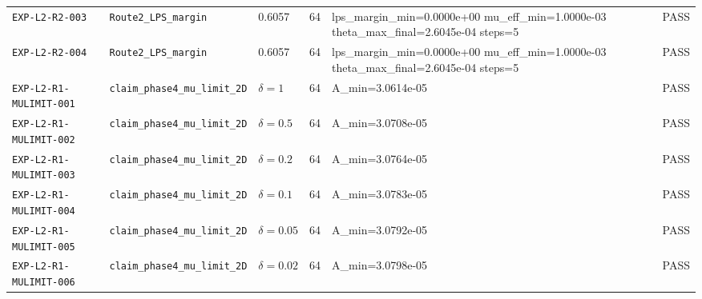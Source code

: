 {\begin{longtable}{@{}>{\raggedright\arraybackslash}p{} >{\raggedright\arraybackslash}p{} l l >{\raggedright\arraybackslash}p{} l@{}}
\texttt{EXP-\allowbreak{}L2-\allowbreak{}R2-\allowbreak{}003} & \texttt{Route2\_\allowbreak{}LPS\_\allowbreak{}margin} & 0.6057 & 64 & lps\_\allowbreak{}margin\_\allowbreak{}min=\allowbreak{}0.0000e+00  mu\_\allowbreak{}eff\_\allowbreak{}min=\allowbreak{}1.0000e-03  theta\_\allowbreak{}max\_\allowbreak{}final=\allowbreak{}2.6045e-04  steps=\allowbreak{}5 & \textsf{PASS}\\
\texttt{EXP-\allowbreak{}L2-\allowbreak{}R2-\allowbreak{}004} & \texttt{Route2\_\allowbreak{}LPS\_\allowbreak{}margin} & 0.6057 & 64 & lps\_\allowbreak{}margin\_\allowbreak{}min=\allowbreak{}0.0000e+00  mu\_\allowbreak{}eff\_\allowbreak{}min=\allowbreak{}1.0000e-03  theta\_\allowbreak{}max\_\allowbreak{}final=\allowbreak{}2.6045e-04  steps=\allowbreak{}5 & \textsf{PASS}\\
\texttt{EXP-\allowbreak{}L2-\allowbreak{}R1-\allowbreak{}MULIMIT-\allowbreak{}001} & \texttt{claim\_\allowbreak{}phase4\_\allowbreak{}mu\_\allowbreak{}limit\_\allowbreak{}2D} & $\delta=\allowbreak{}1$ & 64 & A\_\allowbreak{}min=\allowbreak{}3.0614e-05 & \textsf{PASS}\\
\texttt{EXP-\allowbreak{}L2-\allowbreak{}R1-\allowbreak{}MULIMIT-\allowbreak{}002} & \texttt{claim\_\allowbreak{}phase4\_\allowbreak{}mu\_\allowbreak{}limit\_\allowbreak{}2D} & $\delta=\allowbreak{}0.5$ & 64 & A\_\allowbreak{}min=\allowbreak{}3.0708e-05 & \textsf{PASS}\\
\texttt{EXP-\allowbreak{}L2-\allowbreak{}R1-\allowbreak{}MULIMIT-\allowbreak{}003} & \texttt{claim\_\allowbreak{}phase4\_\allowbreak{}mu\_\allowbreak{}limit\_\allowbreak{}2D} & $\delta=\allowbreak{}0.2$ & 64 & A\_\allowbreak{}min=\allowbreak{}3.0764e-05 & \textsf{PASS}\\
\texttt{EXP-\allowbreak{}L2-\allowbreak{}R1-\allowbreak{}MULIMIT-\allowbreak{}004} & \texttt{claim\_\allowbreak{}phase4\_\allowbreak{}mu\_\allowbreak{}limit\_\allowbreak{}2D} & $\delta=\allowbreak{}0.1$ & 64 & A\_\allowbreak{}min=\allowbreak{}3.0783e-05 & \textsf{PASS}\\
\texttt{EXP-\allowbreak{}L2-\allowbreak{}R1-\allowbreak{}MULIMIT-\allowbreak{}005} & \texttt{claim\_\allowbreak{}phase4\_\allowbreak{}mu\_\allowbreak{}limit\_\allowbreak{}2D} & $\delta=\allowbreak{}0.05$ & 64 & A\_\allowbreak{}min=\allowbreak{}3.0792e-05 & \textsf{PASS}\\
\texttt{EXP-\allowbreak{}L2-\allowbreak{}R1-\allowbreak{}MULIMIT-\allowbreak{}006} & \texttt{claim\_\allowbreak{}phase4\_\allowbreak{}mu\_\allowbreak{}limit\_\allowbreak{}2D} & $\delta=\allowbreak{}0.02$ & 64 & A\_\allowbreak{}min=\allowbreak{}3.0798e-05 & \textsf{PASS}\\

\end{longtable}}
